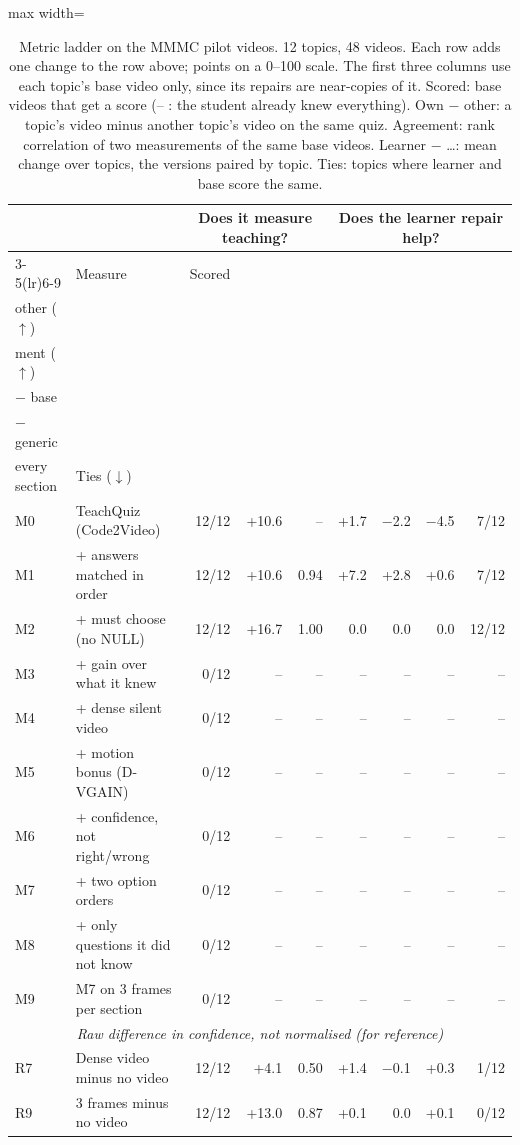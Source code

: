 \begin{table}[!tbp]\centering\footnotesize
\caption{Metric ladder on the MMMC pilot videos. 12 topics, 48 videos. Each row adds one change to the row above; points on a 0--100 scale. The first three columns use each topic's base video only, since its repairs are near-copies of it. Scored: base videos that get a score (-- : the student already knew everything). Own $-$ other: a topic's video minus another topic's video on the same quiz. Agreement: rank correlation of two measurements of the same base videos. Learner $-$ \ldots: mean change over topics, the versions paired by topic. Ties: topics where learner and base score the same.}\label{tab:ladder_mmmc}
\setlength{\tabcolsep}{4pt}\begin{adjustbox}{max width=\linewidth}\begin{tabular}{@{}llrrrrrrr@{}}\toprule & & \multicolumn{3}{c}{Does it measure teaching?} & \multicolumn{4}{c}{Does the learner repair help?}\\
\cmidrule(lr){3-5}\cmidrule(lr){6-9}
& Measure & Scored & \hd{Own $-$\\other ($\uparrow$)} & \hd{Agree-\\ment ($\uparrow$)} & \hd{Learner\\$-$ base} & \hd{Learner\\$-$ generic} & \hd{Learner $-$\\every section} & Ties ($\downarrow$)\\\midrule
M0 & TeachQuiz (Code2Video) & 12/12 & +10.6 & -- & +1.7 & $-$2.2 & $-$4.5 & 7/12 \\
M1 & + answers matched in order & 12/12 & +10.6 & 0.94 & +7.2 & +2.8 & +0.6 & 7/12 \\
M2 & + must choose (no NULL) & 12/12 & +16.7 & 1.00 & 0.0 & 0.0 & 0.0 & 12/12 \\
M3 & + gain over what it knew & 0/12 & -- & -- & -- & -- & -- & -- \\
M4 & + dense silent video & 0/12 & -- & -- & -- & -- & -- & -- \\
M5 & + motion bonus (D-VGAIN) & 0/12 & -- & -- & -- & -- & -- & -- \\
M6 & + confidence, not right/wrong & 0/12 & -- & -- & -- & -- & -- & -- \\
M7 & + two option orders & 0/12 & -- & -- & -- & -- & -- & -- \\
M8 & + only questions it did not know & 0/12 & -- & -- & -- & -- & -- & -- \\
M9 & M7 on 3 frames per section & 0/12 & -- & -- & -- & -- & -- & -- \\
\midrule
\multicolumn{9}{c}{\textit{Raw difference in confidence, not normalised (for reference)}}\\
R7 & Dense video minus no video & 12/12 & +4.1 & 0.50 & +1.4 & $-$0.1 & +0.3 & 1/12 \\
R9 & 3 frames minus no video & 12/12 & +13.0 & 0.87 & +0.1 & 0.0 & +0.1 & 0/12 \\
\bottomrule\end{tabular}\end{adjustbox}
\end{table}
